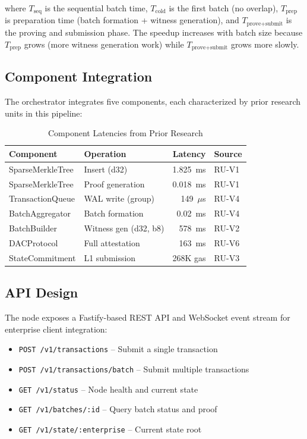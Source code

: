\noindent where $T_\text{seq}$ is the sequential batch time, $T_\text{cold}$
is the first batch (no overlap), $T_\text{prep}$ is preparation time
(batch formation + witness generation), and $T_\text{prove+submit}$ is
the proving and submission phase. The speedup increases with batch size
because $T_\text{prep}$ grows (more witness generation work) while
$T_\text{prove+submit}$ grows more slowly.

\subsection{Component Integration}

The orchestrator integrates five components, each characterized by prior
research units in this pipeline:

\begin{table}[htbp]
\centering
\caption{Component Latencies from Prior Research}
\label{tab:components}
\begin{tabular}{llrl}
\toprule
\textbf{Component} & \textbf{Operation} & \textbf{Latency} & \textbf{Source} \\
\midrule
SparseMerkleTree & Insert (d32) & 1.825~ms & RU-V1 \\
SparseMerkleTree & Proof generation & 0.018~ms & RU-V1 \\
TransactionQueue & WAL write (group) & 149~$\mu$s & RU-V4 \\
BatchAggregator  & Batch formation & 0.02~ms & RU-V4 \\
BatchBuilder     & Witness gen (d32, b8) & 578~ms & RU-V2 \\
DACProtocol      & Full attestation & 163~ms & RU-V6 \\
StateCommitment  & L1 submission & 268K gas & RU-V3 \\
\bottomrule
\end{tabular}
\end{table}

\subsection{API Design}

The node exposes a Fastify-based REST API and WebSocket event stream for
enterprise client integration:

\begin{itemize}
\item \texttt{POST /v1/transactions} -- Submit a single transaction
\item \texttt{POST /v1/transactions/batch} -- Submit multiple transactions
\item \texttt{GET /v1/status} -- Node health and current state
\item \texttt{GET /v1/batches/:id} -- Query batch status and proof
\item \texttt{GET /v1/state/:enterprise} -- Current state root
\end{itemize}

